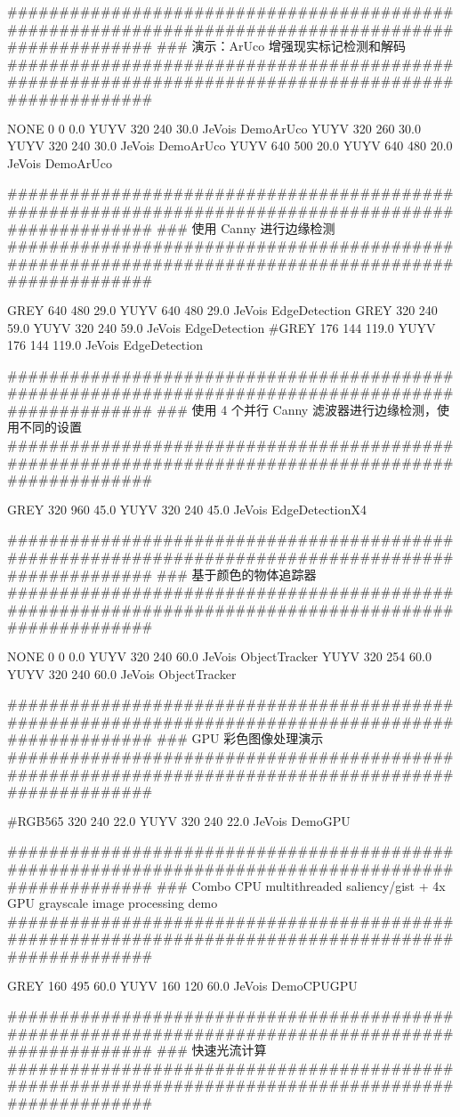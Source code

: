 \begin{DoxyVerb}
#################################################################################################### 
### 演示：ArUco 增强现实标记检测和解码
####################################################################################################

NONE 0 0 0.0 YUYV 320 240 30.0 JeVois DemoArUco
YUYV 320 260 30.0 YUYV 320 240 30.0 JeVois DemoArUco
YUYV 640 500 20.0 YUYV 640 480 20.0 JeVois DemoArUco

#################################################################################################### 
### 使用 Canny 进行边缘检测 
####################################################################################################

GREY 640 480 29.0 YUYV 640 480 29.0 JeVois EdgeDetection
GREY 320 240 59.0 YUYV 320 240 59.0 JeVois EdgeDetection
#GREY 176 144 119.0 YUYV 176 144 119.0 JeVois EdgeDetection

####################################################################################################
### 使用 4 个并行 Canny 滤波器进行边缘检测，使用不同的设置 
####################################################################################################

GREY 320 960 45.0 YUYV 320 240 45.0 JeVois EdgeDetectionX4

#################################################################################################### 
### 基于颜色的物体追踪器 
####################################################################################################

NONE 0 0 0.0 YUYV 320 240 60.0 JeVois ObjectTracker
YUYV 320 254 60.0 YUYV 320 240 60.0 JeVois ObjectTracker

#################################################################################################### 
### GPU 彩色图像处理演示 
####################################################################################################

#RGB565 320 240 22.0 YUYV 320 240 22.0 JeVois DemoGPU

####################################################################################################
### Combo CPU multithreaded saliency/gist + 4x GPU grayscale image processing demo
####################################################################################################

GREY 160 495 60.0 YUYV 160 120 60.0 JeVois DemoCPUGPU

#################################################################################################### 
### 快速光流计算 
####################################################################################################


\end{DoxyVerb}
